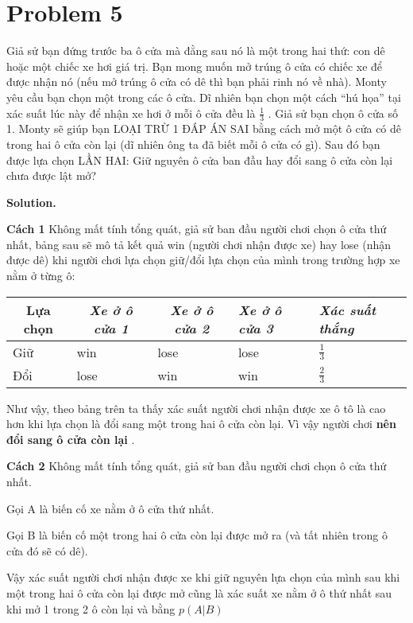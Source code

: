 \documentclass[a4paper, 12pt]{article}  %
\begin{document}
\section{Problem 5}
Giả sử bạn đứng trước ba ô cửa mà đằng sau nó là một trong hai thứ: con dê hoặc một chiếc xe hơi giá trị. Bạn mong muốn mở trúng ô cửa có chiếc xe để được nhận nó (nếu mở trúng ô cửa có dê thì bạn phải rinh nó về nhà). Monty yêu cầu bạn chọn một trong các ô cửa. Dĩ nhiên bạn chọn một cách “hú họa” tại xác suất lúc này để nhận xe hơi ở mỗi ô cửa đều là $\frac{1}{3}$ . Giả sử bạn chọn ô cửa số 1. Monty sẽ giúp bạn LOẠI TRỪ 1 ĐÁP ÁN SAI bằng cách mở một ô cửa có dê trong hai ô cửa còn lại (dĩ nhiên ông ta đã biết mỗi ô cửa có gì). Sau đó bạn được lựa chọn LẦN HAI: Giữ nguyên ô cửa ban đầu hay đổi sang ô cửa còn lại chưa được lật mở?

\textbf{Solution.} 

\textbf{Cách 1}
Không mất tính tổng quát, giả sử ban đầu người chơi chọn ô cửa thứ nhất, bảng sau sẽ mô tả kết quả win (người chơi nhận được xe) hay lose (nhận được dê) khi người chơi lựa chọn giữ/đổi lựa chọn của mình trong trường hợp xe nằm ở từng ô:

\begin{center}
  \begin{tabular}{lllll}
\multicolumn{1}{c}{\textbf{Lựa chọn}} & \multicolumn{1}{c}{\textit{Xe ở ô cửa 1}} & \multicolumn{1}{c}{\textit{Xe ở ô cửa 2}} & \textit{Xe ở ô cửa 3} & \textit{Xác suất thắng} \\ \hline
Giữ     & win       & lose      & lose           & $\frac{1}{3}$ \\
Đổi     & lose      & win       & win            & $\frac{2}{3}$ \\         
\end{tabular}  
\end{center}

Như vậy, theo bảng trên ta thấy xác suất người chơi nhận được xe ô tô là cao hơn khi lựa chọn là đổi sang một trong hai ô cửa còn lại. Vì vậy người chơi \textbf{nên đổi sang ô cửa còn lại }.
\vspace{5mm}

\textbf{Cách 2}
Không mất tính tổng quát, giả sử ban đầu người chơi chọn ô cửa thứ nhất.

Gọi A là biến cố xe nằm ở ô cửa thứ nhất.

Gọi B là biến cố một trong hai ô cửa còn lại được mở ra (và tất nhiên trong ô cửa đó sẽ có dê).

Vậy xác suất người chơi nhận được xe khi giữ nguyên lựa chọn của mình sau khi một trong hai ô cửa còn lại được mở cũng là xác suất xe nằm ở ô thứ nhất sau khi mở 1 trong 2 ô còn lại và bằng $p(A|B)$
\end{document}
